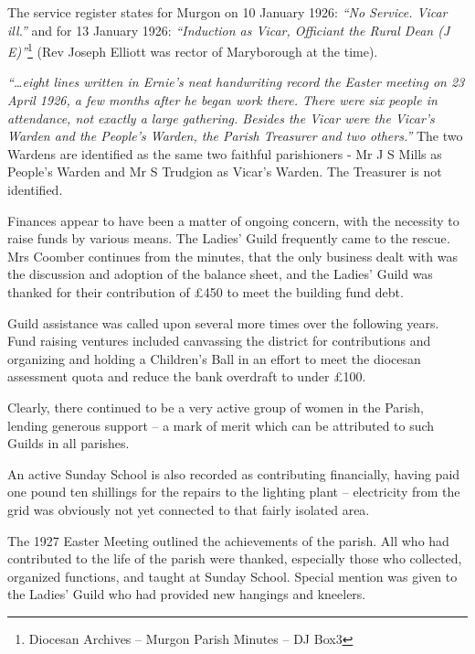 The service register states for Murgon on 10 January 1926: \emph{``No Service. Vicar ill.''} and for 13 January 1926: \emph{``Induction as Vicar, Officiant the Rural Dean (J E)''}\footnote{Diocesan Archives -- Murgon Parish Minutes -- DJ Box3} (Rev Joseph Elliott was rector of Maryborough at the time).


\emph{``\ldots eight lines written in Ernie's neat handwriting record the Easter meeting on 23 April 1926, a few months after he began work there. There were six people in attendance, not exactly a large gathering. Besides the Vicar were the Vicar's Warden and the People's Warden, the Parish Treasurer and two others.''} The two Wardens are identified as the same two faithful parishioners - Mr J S Mills as People's Warden and Mr S Trudgion as Vicar's Warden. The Treasurer is not identified.



Finances appear to have been a matter of ongoing concern, with the necessity to raise funds by various means. The Ladies' Guild frequently came to the rescue\emph{.} Mrs Coomber continues from the minutes, that the only business dealt with was the discussion and adoption of the balance sheet, and the Ladies' Guild was thanked for their contribution of \pounds450 to meet the building fund debt.



\balance


Guild assistance was called upon several more times over the following years. Fund raising ventures included canvassing the district for contributions and organizing and holding a Children's Ball in an effort to meet the diocesan assessment quota and reduce the bank overdraft to under \pounds100.



Clearly, there continued to be a very active group of women in the Parish, lending generous support -- a mark of merit which can be attributed to such Guilds in all parishes.



An active Sunday School is also recorded as contributing financially, having paid one pound ten shillings for the repairs to the lighting plant -- electricity from the grid was obviously not yet connected to that fairly isolated area.



The 1927 Easter Meeting outlined the achievements of the parish. All who had contributed to the life of the parish were thanked, especially those who collected, organized functions, and taught at Sunday School. Special mention was given to the Ladies' Guild who had provided new hangings and kneelers.



